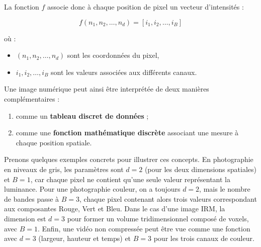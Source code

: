 La fonction $f$ associe donc à chaque position de pixel un vecteur d'intensités :

\[
f(n_1,n_2,\dots, n_d) = [i_1,i_2,\dots,i_B]
\]

où :

\begin{itemize}
\item[-] $(n_1,n_2,\dots, n_d)$ sont les coordonnées du pixel,
\item[-] $i_1,i_2,\dots,i_B$ sont les valeurs associées aux différents canaux.
\end{itemize}



Une image numérique peut ainsi être interprétée de deux manières complémentaires :

\begin{enumerate}
\item[-] comme un \textbf{tableau discret de données} ;
\item[-] comme une \textbf{fonction mathématique discrète} associant une mesure à chaque position spatiale.
\end{enumerate}
Prenons quelques exemples concrets pour illustrer ces concepts. En photographie en niveaux de gris, les paramètres sont \(d = 2\) (pour les deux dimensions spatiales) et \(B = 1\), car chaque pixel ne contient qu'une seule valeur représentant la luminance. Pour une photographie couleur, on a toujours \(d = 2\), mais le nombre de bandes passe à \(B = 3\), chaque pixel contenant alors trois valeurs correspondant aux composantes Rouge, Vert et Bleu. Dans le cas d'une image IRM, la dimension est \(d = 3\) pour former un volume tridimensionnel composé de voxels, avec \(B = 1\). Enfin, une vidéo non compressée peut être vue comme une fonction avec \(d = 3\) (largeur, hauteur et temps) et \(B = 3\) pour les trois canaux de couleur.

